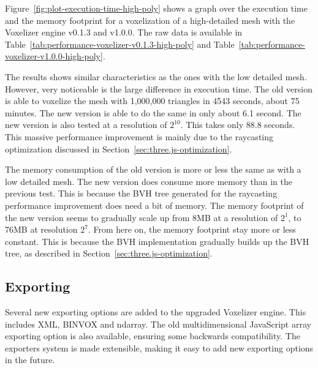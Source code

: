 Figure~\ref{fig:plot-execution-time-high-poly} shows a graph over the execution time and the memory footprint for a voxelization of a high-detailed mesh with the Voxelizer engine v0.1.3 and v1.0.0. The raw data is available in Table~\ref{tab:performance-voxelizer-v0.1.3-high-poly} and Table~\ref{tab:performance-voxelizer-v1.0.0-high-poly}.

The results shows similar characteristics as the ones with the low detailed mesh. However, very noticeable is the large difference in execution time. The old version is able to voxelize the mesh with 1,000,000 triangles in 4543 seconds, about 75 minutes. The new version is able to do the same in only about 6.1 second. The new version is also tested at a resolution of $2^{10}$. This takes only 88.8 seconds. This massive performance improvement is mainly due to the raycasting optimization discussed in Section~\ref{sec:three.js-optimization}.

The memory consumption of the old version is more or less the same as with a low detailed mesh. The new version does consume more memory than in the previous test. This is because the BVH tree generated for the raycasting performance improvement does need a bit of memory. The memory footprint of the new version seems to gradually scale up from 8MB at a resolution of $2^1$, to 76MB at resolution $2^7$. From here on, the memory footprint stay more or less constant. This is because the BVH implementation gradually builds up the BVH tree, as described in Section~\ref{sec:three.js-optimization}.

\subsection{Exporting}
Several new exporting options are added to the upgraded Voxelizer engine. This includes XML, BINVOX and ndarray. The old multidimensional JavaScript array exporting option is also available, ensuring some backwards compatibility. The exporters system is made extensible, making it easy to add new exporting options in the future.

